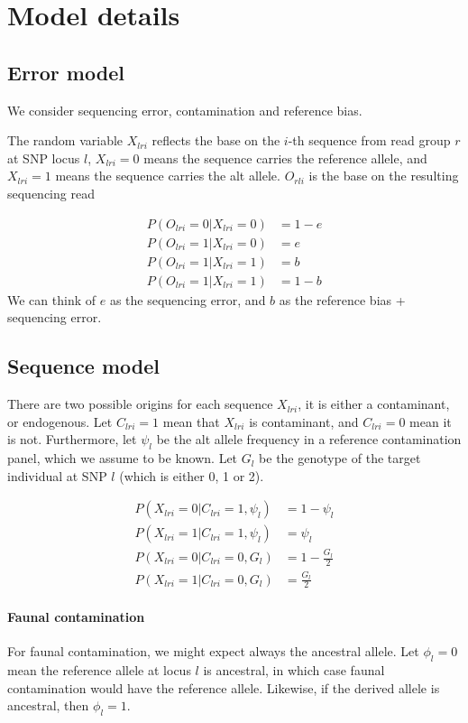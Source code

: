 \documentclass[10pt,a4paper]{article}
\begin{document}
\section*{Model details}
\subsection*{Error model}
We consider sequencing error, contamination and reference bias.

The random variable $X_{lri}$ reflects the base on the $i$-th sequence from read group $r$ at SNP locus $l$, $X_{lri}=0$ means the sequence carries the reference allele, and $X_{lri}=1$ means the sequence carries the alt allele. $O_{rli}$ is the base on the resulting sequencing read

\begin{align}
P(O_{lri}=0 | X_{lri}=0) &= 1-e\nonumber\\
P(O_{lri}=1 | X_{lri}=0) &= e\nonumber\\
P(O_{lri}=1 | X_{lri}=1) &= b\nonumber\\
P(O_{lri}=1 | X_{lri}=1) &= 1-b
\end{align}
We can think of $e$ as the sequencing error, and $b$ as the reference bias + sequencing error.

\subsection*{Sequence model}

There are two possible origins for each sequence $X_{lri}$, it is either a contaminant, or endogenous. 
Let $C_{lri} =1 $ mean that $X_{lri}$ is contaminant, and $C_{lri} =0 $ mean it is not. Furthermore, let $\psi_l$ be the alt allele frequency in a reference contamination panel, which we assume to be known. Let $G_l$ be the genotype of the target individual at SNP $l$ (which is either 0, 1 or 2).


\begin{align}
P(X_{lri} = 0 | C_{lri} = 1, \psi_l) &= 1 - \psi_l\nonumber\\ 
P(X_{lri} = 1 | C_{lri} = 1, \psi_l) &= \psi_l\nonumber\\ 
P(X_{lri} = 0 | C_{lri} = 0, G_l) &= 1 - \frac{G_l}{2}\nonumber\\ 
P(X_{lri} = 1 | C_{lri} = 0, G_l) &= \frac{G_l}{2}
\end{align}

\paragraph{Faunal contamination}
For faunal contamination, we might expect always the ancestral allele. Let $\phi_l=0$ mean the reference allele at locus $l$ is ancestral, in which case faunal contamination would have the reference allele. Likewise, if the derived allele is ancestral, then  $\phi_l=1$. 
\end{document}
